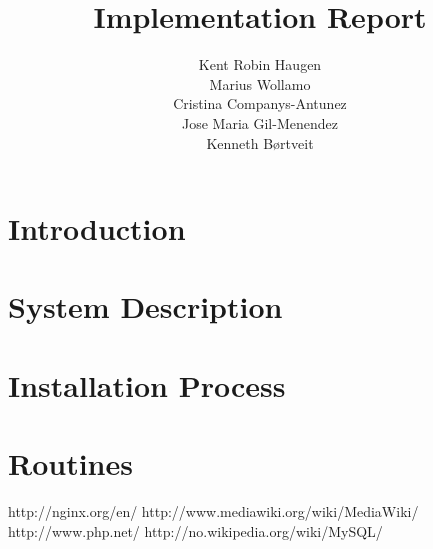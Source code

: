 \documentclass[a4, paper]{article}
\title{Implementation Report}
\author{Kent Robin Haugen \\ Marius Wollamo \\ Cristina Companys-Antunez \\ Jose Maria Gil-Menendez \\ Kenneth Børtveit}
\begin{document}
\maketitle
\tableofcontents
\section{Introduction}

\section{System Description}

\section{Installation Process}

\section{Routines}

\begin{thebibliography}{9}
http://nginx.org/en/
http://www.mediawiki.org/wiki/MediaWiki/
http://www.php.net/
http://no.wikipedia.org/wiki/MySQL/
\end{thebibliography}
\end{document}
